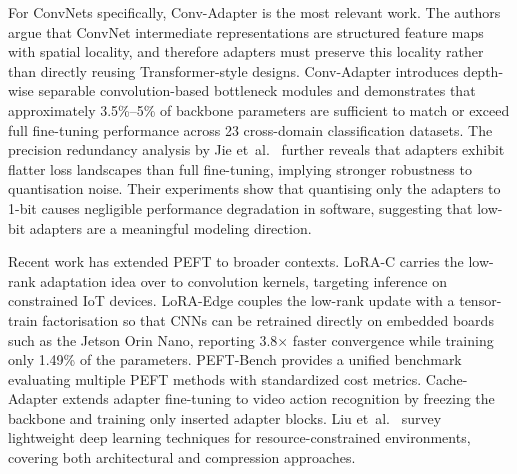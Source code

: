 \documentclass[12pt, a4paper]{report}
\numberwithin{equation}{chapter}
\numberwithin{figure}{chapter}
\numberwithin{table}{chapter}
\numberwithin{algorithm}{chapter}
\begin{document}
For ConvNets specifically, Conv-Adapter \cite{Chen2024ConvAdapter} is the most relevant work. The authors argue that ConvNet intermediate representations are structured feature maps with spatial locality, and therefore adapters must preserve this locality rather than directly reusing Transformer-style designs. Conv-Adapter introduces depth-wise separable convolution-based bottleneck modules and demonstrates that approximately 3.5\%--5\% of backbone parameters are sufficient to match or exceed full fine-tuning performance across 23 cross-domain classification datasets. The precision redundancy analysis by Jie et~al.~\cite{Jie2023PrecisionRedundancy} further reveals that adapters exhibit flatter loss landscapes than full fine-tuning, implying stronger robustness to quantisation noise. Their experiments show that quantising only the adapters to 1-bit causes negligible performance degradation in software, suggesting that low-bit adapters are a meaningful modeling direction.

Recent work has extended PEFT to broader contexts. LoRA-C \cite{Ding2024LoRAC} carries the low-rank adaptation idea over to convolution kernels, targeting inference on constrained IoT devices. LoRA-Edge \cite{Kwak2025LoRAEdge} couples the low-rank update with a tensor-train factorisation so that CNNs can be retrained directly on embedded boards such as the Jetson Orin Nano, reporting 3.8$\times$ faster convergence while training only 1.49\% of the parameters. PEFT-Bench \cite{Belanec2025PEFTBench} provides a unified benchmark evaluating multiple PEFT methods with standardized cost metrics. Cache-Adapter \cite{Lu2025CacheAdapter} extends adapter fine-tuning to video action recognition by freezing the backbone and training only inserted adapter blocks. Liu et~al.~\cite{Liu2024LightweightDLSurvey} survey lightweight deep learning techniques for resource-constrained environments, covering both architectural and compression approaches.
\end{document}
